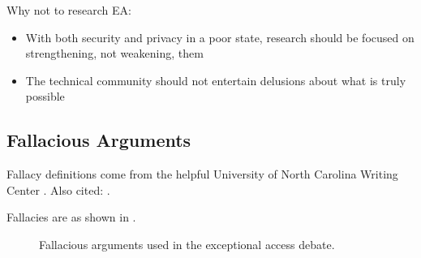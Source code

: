 Why not to research EA:
\begin{itemize}
    \item With both security and privacy in a poor state, research should be focused on strengthening, not weakening,
            them
    \item The technical community should not entertain delusions about what is truly possible
\end{itemize}

\subsection{Fallacious Arguments}

Fallacy definitions come from the helpful University of North Carolina Writing Center \cite{unc_2020}. Also cited:
\cite{hanna_2019}.

Fallacies are as shown in .

\begin{sidewaysfigure}[h]
    \centering\CaptionFontSize
    \caption[Fallacious Arguments]{Fallacious arguments used in the exceptional access debate.}
    \label{fig-args-fallacies}
\end{sidewaysfigure}
